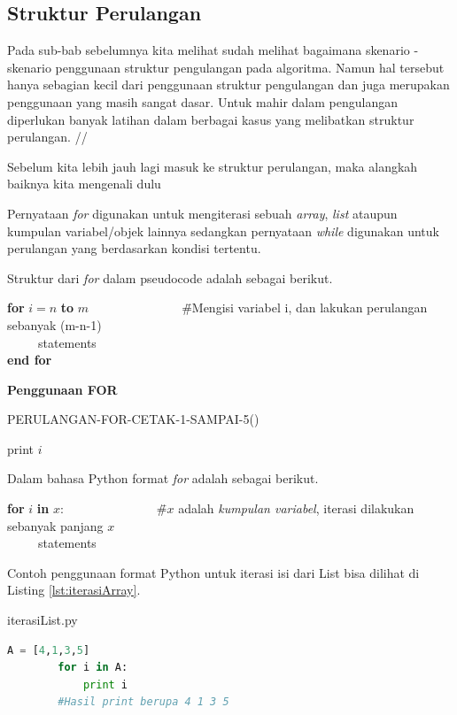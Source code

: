\subsection{Struktur Perulangan}
Pada sub-bab sebelumnya kita melihat sudah melihat bagaimana skenario - skenario penggunaan struktur pengulangan pada algoritma. Namun hal tersebut hanya sebagian kecil dari penggunaan struktur pengulangan dan juga merupakan penggunaan yang masih sangat dasar. Untuk mahir dalam pengulangan diperlukan banyak latihan dalam berbagai kasus yang melibatkan struktur perulangan. //

Sebelum kita lebih jauh lagi masuk ke struktur perulangan, maka alangkah baiknya kita mengenali dulu 

 Pernyataan \textit{for} digunakan untuk mengiterasi sebuah \textit{array}, \textit{list} ataupun kumpulan variabel/objek lainnya sedangkan pernyataan \textit{while} digunakan untuk perulangan yang berdasarkan kondisi tertentu.

Struktur dari \textit{for} dalam pseudocode adalah sebagai berikut.
\begin{tabbing}
\textbf{for} $i=n$ \textbf{to} $m$~~~~~~~~~~~~~~~\=\#Mengisi variabel i, dan lakukan perulangan sebanyak (m-n-1)\\
~~~~~statements\\
\textbf{end for}
\end{tabbing}

\begin{contoh}
	\textbf{Penggunaan FOR}
	\begin{algorithm}
	\caption{PERULANGAN-FOR-CETAK-1-SAMPAI-5()}
		\begin{algorithmic}[1]
			\STATE print $i$
		\ENDFOR
		\STATE{}
		\STATE{}
		\end{algorithmic}
	\end{algorithm}
\end{contoh}

Dalam bahasa Python format \textit{for} adalah sebagai berikut.
\begin{tabbing}
\textbf{for} $i$ \textbf{in} $x$:~~~~~~~~~~~~~~~\=\#$x$ adalah \textit{kumpulan variabel}, iterasi dilakukan sebanyak panjang $x$\\
~~~~~statements\\
\end{tabbing}

Contoh penggunaan format Python untuk iterasi isi dari List bisa dilihat di Listing \ref{lst:iterasiArray}.
\begin{listprog}{iterasiList.py}
	\label{lst:iterasiArray}
	\begin{lstlisting}[language=Python]
		A = [4,1,3,5]
		for i in A:
			print i
		#Hasil print berupa 4 1 3 5
	\end{lstlisting}
\end{listprog}

